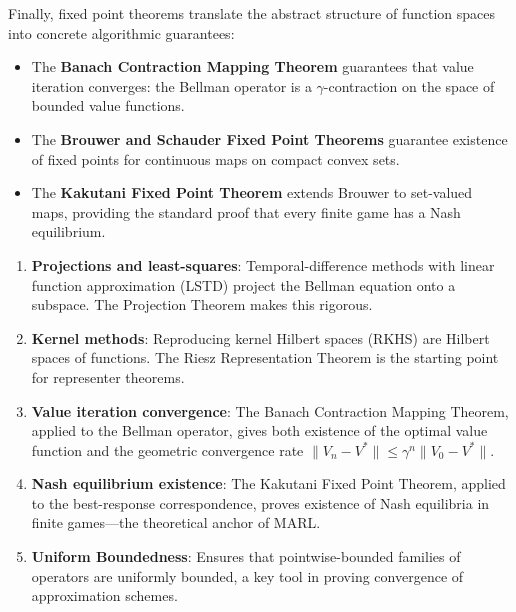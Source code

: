 \documentclass[11pt,a4paper]{article}
\theoremstyle{definition}
\theoremstyle{plain}
\theoremstyle{remark}
\begin{document}
Finally, fixed point theorems translate the abstract structure of function spaces
into concrete algorithmic guarantees:

\begin{itemize}[leftmargin=2em]
    \item The \textbf{Banach Contraction Mapping Theorem} guarantees that
          value iteration converges: the Bellman operator is a
          $\gamma$-contraction on the space of bounded value functions.
    \item The \textbf{Brouwer and Schauder Fixed Point Theorems} guarantee
          existence of fixed points for continuous maps on compact convex sets.
    \item The \textbf{Kakutani Fixed Point Theorem} extends Brouwer to
          set-valued maps, providing the standard proof that every finite
          game has a Nash equilibrium.
\end{itemize}

\begin{rlconnection}
\begin{enumerate}[leftmargin=2em]
    \item \textbf{Projections and least-squares}: Temporal-difference methods
          with linear function approximation (LSTD) project the Bellman
          equation onto a subspace. The Projection Theorem makes this rigorous.
    \item \textbf{Kernel methods}: Reproducing kernel Hilbert spaces (RKHS)
          are Hilbert spaces of functions. The Riesz Representation Theorem
          is the starting point for representer theorems.
    \item \textbf{Value iteration convergence}: The Banach Contraction Mapping
          Theorem, applied to the Bellman operator, gives both existence of
          the optimal value function and the geometric convergence rate
          $\|V_n - V^*\| \leq \gamma^n \|V_0 - V^*\|$.
    \item \textbf{Nash equilibrium existence}: The Kakutani Fixed Point Theorem,
          applied to the best-response correspondence, proves existence of
          Nash equilibria in finite games---the theoretical anchor of MARL.
    \item \textbf{Uniform Boundedness}: Ensures that pointwise-bounded
          families of operators are uniformly bounded, a key tool in proving
          convergence of approximation schemes.
\end{enumerate}
\end{rlconnection}
\end{document}
